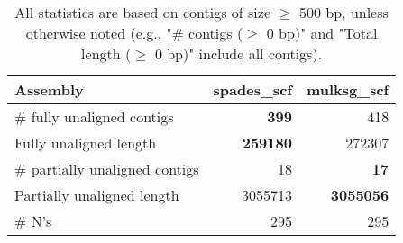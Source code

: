 \documentclass[12pt,a4paper]{article}
\begin{document}
\begin{table}[ht]
\begin{center}
\caption{All statistics are based on contigs of size $\geq$ 500 bp, unless otherwise noted (e.g., "\# contigs ($\geq$ 0 bp)" and "Total length ($\geq$ 0 bp)" include all contigs).}
\begin{tabular}{|l*{2}{|r}|}
\hline
Assembly & spades\_scf & mulksg\_scf \\ \hline
\# fully unaligned contigs & {\bf 399} & 418 \\ \hline
Fully unaligned length & {\bf 259180} & 272307 \\ \hline
\# partially unaligned contigs & 18 & {\bf 17} \\ \hline
Partially unaligned length & 3055713 & {\bf 3055056} \\ \hline
\# N's & 295 & 295 \\ \hline
\end{tabular}
\end{center}
\end{table}
\end{document}
